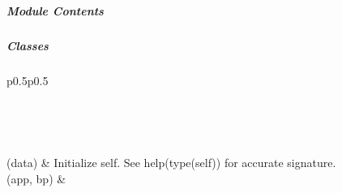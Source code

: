 \documentclass[letterpaper,10pt,english]{sphinxmanual}
\begin{document}
\subparagraph{}
\label{\detokenize{autoapi/pine/backend/auth/oauth/index:module-pine.backend.auth.oauth}}\label{\detokenize{autoapi/pine/backend/auth/oauth/index:pine-backend-auth-oauth}}\label{\detokenize{autoapi/pine/backend/auth/oauth/index::doc}}

\subparagraph{Module Contents}
\label{\detokenize{autoapi/pine/backend/auth/oauth/index:module-contents}}

\subparagraph{Classes}
\label{\detokenize{autoapi/pine/backend/auth/oauth/index:classes}}

\begin{savenotes}\sphinxatlongtablestart\begin{longtable}[c]{p{0.5\linewidth}p{0.5\linewidth}}
\hline

\endfirsthead

%
{}\\
\hline

\endhead

\hline
{}\\
\endfoot

\endlastfoot

{\hyperref[\detokenize{autoapi/pine/backend/auth/oauth/index:pine.backend.auth.oauth.OAuthUser}]{}}(data)
&
Initialize self.  See help(type(self)) for accurate signature.
\\
\hline
{\hyperref[\detokenize{autoapi/pine/backend/auth/oauth/index:pine.backend.auth.oauth.OAuthModule}]{}}(app, bp)
&

\\
\hline
\end{longtable}\sphinxatlongtableend\end{savenotes}
\end{document}
